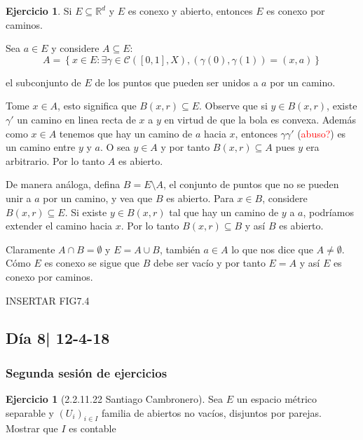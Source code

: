\documentclass[12pt]{article}
\theoremstyle{plain}
\theoremstyle{definition}
\newtheorem{Ej}[Th]{Ejercicio}
\theoremstyle{remark}
\numberwithin{equation}{section}
\newcommand{\bR}{\mathbb{R}}        %
\newcommand{\cC}{\mathcal{C}}       %
\renewcommand{\:}{\colon}           %
\newcommand{\conj}[1]{\left\lbrace#1\right\rbrace}
\newcommand{\bonj}[1]{\left\lbrack#1\right\rbrack}
\begin{document}
\begin{multicols}{2}
\begin{Ej}
  Si $E\subseteq\bR^d$ y $E$ es conexo y abierto, entonces $E$ es conexo por caminos.
\end{Ej}

\begin{ptcb}
 Sea $a\in E$ y considere $A\subseteq E$:
 $$A=\conj{x\in E\colon\exists\gamma\in\cC(\bonj{0,1},X),(\gamma(0),\gamma(1))=(x,a)}$$

 el subconjunto de $E$ de los puntos que pueden ser unidos a $a$ por un camino.\par

  Tome $x\in A$, esto significa que $B(x,r)\subseteq E$. Observe que si $y\in B(x,r)$, existe $\gamma'$ un camino en linea recta de $x$ a $y$ en virtud de que la bola es convexa. Además como $x\in A$ tenemos que hay un camino de $a$ hacia $x$, entonces $\gamma\gamma'$ (\textcolor{red}{abuso?}) es un camino entre $y$ y $a$. O sea $y\in A$ y por tanto $B(x,r)\subseteq A$ pues $y$ era arbitrario. Por lo tanto $A$ es abierto. \par
 De manera análoga, defina $B=E\setminus A$, el conjunto de puntos que no se pueden unir a $a$ por un camino, y vea que $B$ es abierto. Para $x\in B$, considere $B(x,r)\subseteq E$. Si existe $y\in B(x,r)$ tal que hay un camino de $y$ a $a$, podríamos extender el camino hacia $x$. Por lo tanto $B(x,r)\subseteq B$ y así $B$ es abierto.\par
 Claramente $A\cap B=\emptyset$ y $E=A\cup B$, también $a\in A$ lo que nos dice que $A\neq\emptyset$. Cómo $E$ es conexo se sigue que $B$ debe ser vacío y por tanto $E=A$ y así $E$ es conexo por caminos.
\end{ptcb}
INSERTAR FIG7.4

\subsection{Día 8| 12-4-18}

\subsubsection*{Segunda sesión de ejercicios}

\begin{Ej}[2.2.11.22 Santiago Cambronero]
  Sea $E$ un espacio métrico separable y $(U_i)_{i\in I}$ familia de abiertos no vacíos, disjuntos por parejas. Mostrar que $I$ es contable
\end{Ej}


\end{multicols}
\end{document}
